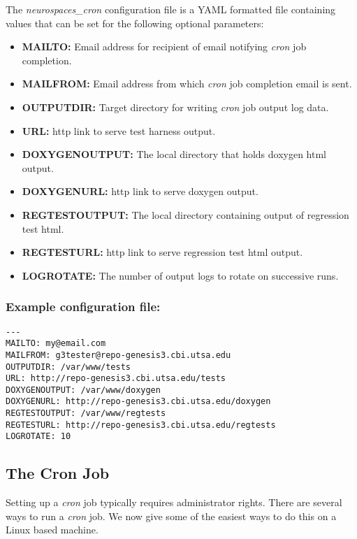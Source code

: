 \documentclass[12pt]{article}
\begin{document}
The  {\it neurospaces\_cron} configuration file is a YAML formatted file containing values that can be set for the following optional parameters:
\begin{itemize}
   \item[]{\bf MAILTO:} Email address for recipient of email notifying {\it cron} job completion.
   \item[]{\bf MAILFROM:} Email address from which {\it cron} job completion email is sent.
   \item[]{\bf OUTPUTDIR:} Target directory for writing {\it cron} job output log data.
   \item[]{\bf URL:} http link to serve test harness output.
   \item[]{\bf DOXYGENOUTPUT:} The local directory that holds doxygen html output.
   \item[]{\bf DOXYGENURL:} http link to serve doxygen output.
   \item[]{\bf REGTESTOUTPUT:} The local directory containing output of regression test html.
   \item[]{\bf REGTESTURL:} http link to serve regression test html output.
   \item[]{\bf LOGROTATE:} The number of output logs to rotate on successive runs.
\end{itemize}

\subsubsection*{Example configuration file:}

\begin{verbatim}
---
MAILTO: my@email.com
MAILFROM: g3tester@repo-genesis3.cbi.utsa.edu
OUTPUTDIR: /var/www/tests
URL: http://repo-genesis3.cbi.utsa.edu/tests
DOXYGENOUTPUT: /var/www/doxygen
DOXYGENURL: http://repo-genesis3.cbi.utsa.edu/doxygen
REGTESTOUTPUT: /var/www/regtests
REGTESTURL: http://repo-genesis3.cbi.utsa.edu/regtests
LOGROTATE: 10

\end{verbatim}

\subsection*{The Cron Job}

Setting up a {\it cron} job typically requires administrator rights. There are several ways to run a {\it cron} job. We now give some of the easiest ways to do this on a Linux based machine.
\end{document}
